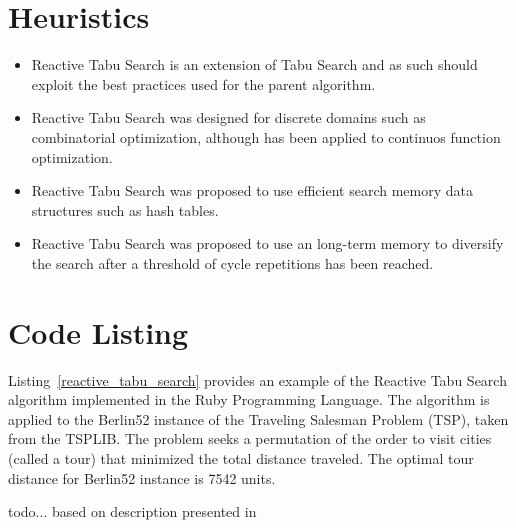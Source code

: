 \documentclass[a4paper, 11pt]{article}
\begin{document}
\section{Heuristics}
\label{sec:heuristics}
\begin{itemize}
	\item Reactive Tabu Search is an extension of Tabu Search and as such should exploit the best practices used for the parent algorithm.
	\item Reactive Tabu Search was designed for discrete domains such as combinatorial optimization, although has been applied to continuos function optimization.
	\item Reactive Tabu Search was proposed to use efficient search memory data structures such as hash tables.
	\item Reactive Tabu Search was proposed to use an long-term memory to diversify the search after a threshold of cycle repetitions has been reached.
\end{itemize}

\section{Code Listing}
\label{sec:code}
Listing~\ref{reactive_tabu_search} provides an example of the Reactive Tabu Search algorithm implemented in the Ruby Programming Language. 
The algorithm is applied to the Berlin52 instance of the Traveling Salesman Problem (TSP), taken from the TSPLIB. The problem seeks a permutation of the order to visit cities (called a tour) that minimized the total distance traveled. The optimal tour distance for Berlin52 instance is 7542 units.

todo... based on description presented in \cite{Battiti1994}
\end{document}
